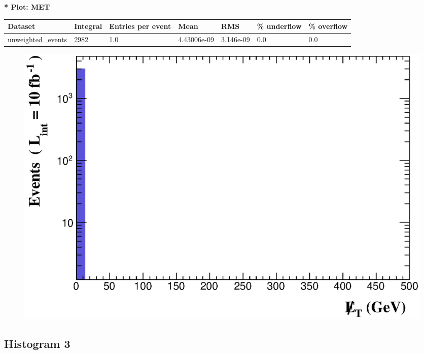 \documentclass[a4paper, 10pt]{article}
\begin{document}
\textbf{* Plot: MET}\\
   \begin{table}[H]
  \begin{center}
    \begin{tabular}{|m{23.0mm}|m{23.0mm}|m{18.0mm}|m{19.0mm}|m{19.0mm}|m{19.0mm}|m{19.0mm}|}
      \hline
      {\cellcolor{yellow}         Dataset}& {\cellcolor{yellow}         Integral}& {\cellcolor{yellow}         Entries per event}& {\cellcolor{yellow}         Mean}& {\cellcolor{yellow}         RMS}& {\cellcolor{yellow}         \% underflow}& {\cellcolor{yellow}         \% overflow}\\
      \hline
      {\cellcolor{white}         unweighted\_events}& {\cellcolor{white}         2982}& {\cellcolor{white}         1.0}& {\cellcolor{white}         4.43006e-09}& {\cellcolor{white}         3.146e-09}& {\cellcolor{green}         0.0}& {\cellcolor{green}         0.0}\\
\hline
    \end{tabular}
  \end{center}
\end{table}

\begin{figure}[H]
  \begin{center}
    \includegraphics[scale=0.45]{selection_1.eps}\\
\caption{   }
  \end{center}
\end{figure}
      \newpage
\subsection{ Histogram 3}
\end{document}
